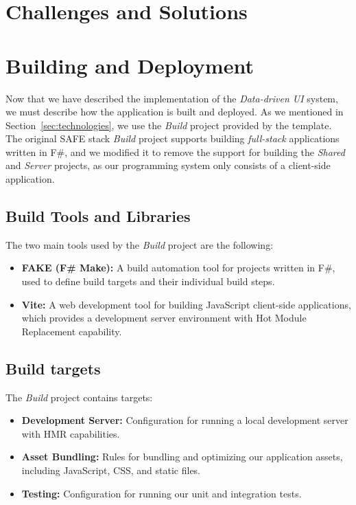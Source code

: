 \section{Challenges and Solutions}

\section{Building and Deployment}

Now that we have described the implementation of the \emph{Data-driven UI} system, we must describe how the application is built and deployed. 
As we mentioned in Section~\ref{sec:technologies}, we use the \emph{Build} project provided by the \citet{safestack} template.
The original SAFE stack \emph{Build} project supports building \emph{full-stack} applications written in F\#, and we modified it to remove the support for building 
the \emph{Shared} and \emph{Server} projects, as our programming system only consists of a client-side application.

\subsection{Build Tools and Libraries}

The two main tools used by the \emph{Build} project are the following:
\begin{itemize}
 \item \textbf{FAKE (F\# Make):} A build automation tool for projects written in F\#, used to define build targets and their individual build steps.
  \item \textbf{Vite:} A web development tool for building JavaScript client-side applications, which provides a development server environment with Hot Module Replacement capability.
\end{itemize}

\subsection{Build targets}

The \emph{Build} project contains  targets:

\begin{itemize}
    \item \textbf{Development Server:} Configuration for running a local development server with HMR capabilities.
    \item \textbf{Asset Bundling:} Rules for bundling and optimizing our application assets, including JavaScript, CSS, and static files.
    \item \textbf{Testing:} Configuration for running our unit and integration tests.
    
\end{itemize}



